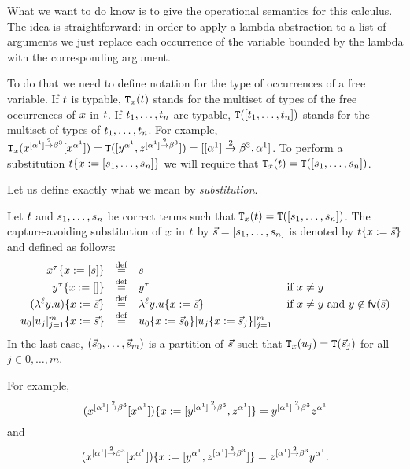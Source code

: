 What we want to do know is to give the operational semantics for this calculus.
The idea is straightforward: in order to apply a lambda abstraction to a list of arguments we just
replace each occurrence of the variable bounded by the lambda with the corresponding argument.

To do that we need to define notation for the type
of occurrences of a free variable. If $t$ is typable,
$\mathtt{T}_{x}(t)$
stands for the multiset
of types of the free occurrences of $x$ in $t$.
If $t_1,\hdots,t_n$ are typable,
$\mathtt{T}([t_1,\hdots,t_n])$ stands for the multiset
of types of $t_1,\hdots,t_n$.
For example,
$\mathtt{T}_{x}(x^{[\alpha^1] \overset{2}{\to} \beta^3}[x^{\alpha^1}]) =
\mathtt{T}([y^{\alpha^1},z^{[\alpha^1] \overset{2}{\to} \beta^3}]) = [[\alpha^1] \overset{2}{\to} \beta^3,\alpha^1]$.
To perform a substitution $t\{x := [s_1,\hdots,s_n]\}$
we will require that $\mathtt{T}_{x}(t) = \mathtt{T}([s_1,\hdots,s_n])$.


Let us define exactly what we mean by \emph{substitution}.
\begin{definition}[Substitution]
Let $t$ and $s_1,\hdots,s_n$ be correct terms such that $\mathtt{T}_{x}(t) = \mathtt{T}([s_1,\hdots,s_n])$.
The capture-avoiding substitution of $x$ in $t$ by $\vec{s} = [s_1,\hdots,s_n]$
is denoted by $t\{x := \vec{s}\}$ and defined as follows:
\[
  \begin{array}{rcll}
    x^\tau\{x := [s]\} & \overset{\mathrm{def}}{=} & s
  \\
    y^\tau\{x := []\} & \overset{\mathrm{def}}{=} & y^\tau
    & \text{ if $x \neq y$}
  \\
    (\lambda^{\ell} y. u)\{x := \vec{s}\} & \overset{\mathrm{def}}{=} &  \lambda^{\ell} y.  u\{x := \vec{s}\}
    & \text{ if $x \neq y$ and $y \not\in \mathsf{fv}({\vec{s}})$}
  \\
    u_0[u_j]_{j=1}^{m}\{x := \vec{s}\} & \overset{\mathrm{def}}{=} &
    u_0\{x := \vec{s}_0\}[u_j\{x := \vec{s}_j\}]_{j=1}^{m}
  \end{array}
\]
In the last case, $(\vec{s}_0, \hdots, \vec{s}_m)$
is a partition of $\vec{s}$
such that $\mathtt{T}_{x}(u_j) = \mathtt{T}(\vec{s}_j)$ for all $j \in {0,\hdots,m}$.
\end{definition}

For example,
\[(x^{[\alpha^1] \overset{2}{\to} \beta^3}[x^{\alpha^1}])\{x := [y^{[\alpha^1] \overset{2}{\to} \beta^3},z^{\alpha^1}]\}
= y^{[\alpha^1] \overset{2}{\to} \beta^3}z^{\alpha^1}\]
and
\[(x^{[\alpha^1] \overset{2}{\to} \beta^3}[x^{\alpha^1}])\{x := [y^{\alpha^1},z^{[\alpha^1] \overset{2}{\to} \beta^3}]\}
= z^{[\alpha^1] \overset{2}{\to} \beta^3}y^{\alpha^1}.\]



